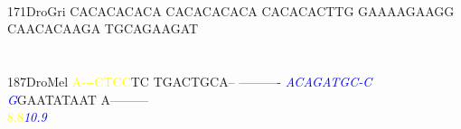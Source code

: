 \documentclass[11pt,twoside,reqno,a4paper]{article}
\begin{document}
{\hspace*{4\charwidth}\hspace*{7\charwidth}\hspace*{1\charwidth}\hspace*{1\charwidth}\hspace*{1\charwidth}\hspace*{1\charwidth}\hspace*{1\charwidth}\hspace*{1\charwidth}\\
171\hspace*{1\charwidth}DroGri	CACACACACA	CACACACACA	CACACACTTG	GAAAAGAAGG	CAACACAAGA	TGCAGAAGAT	\\
\hspace*{4\charwidth}\hspace*{7\charwidth}\hspace*{1\charwidth}\hspace*{1\charwidth}\hspace*{1\charwidth}\hspace*{1\charwidth}\hspace*{1\charwidth}\hspace*{1\charwidth}\\
\\
187\hspace*{1\charwidth}DroMel	\textcolor{Yellow}{A}\textcolor{Yellow}{-}\textcolor{Yellow}{-}\textcolor{Yellow}{-}\textcolor{Yellow}{C}\textcolor{Yellow}{T}\textcolor{Yellow}{C}\textcolor{Yellow}{C}TC	TGACTGCA--	----------	\textit{\textcolor{Blue}{A}}\textit{\textcolor{Blue}{C}}\textit{\textcolor{Blue}{A}}\textit{\textcolor{Blue}{G}}\textit{\textcolor{Blue}{A}}\textit{\textcolor{Blue}{T}}\textit{\textcolor{Blue}{G}}\textit{\textcolor{Blue}{C}}\textit{\textcolor{Blue}{-}}\textit{\textcolor{Blue}{C}}	\textit{\textcolor{Blue}{G}}GAATATAAT	A---------	\\
\hspace*{4\charwidth}\hspace*{7\charwidth}\hspace*{0\charwidth}\textcolor{Yellow}{8.8}\hspace*{1\charwidth}\hspace*{1\charwidth}\hspace*{1\charwidth}\hspace*{27\charwidth}\textit{\textcolor{Blue}{10.9}}\hspace*{1\charwidth}\hspace*{1\charwidth}\hspace*{1\charwidth}\\
}
\end{document}
